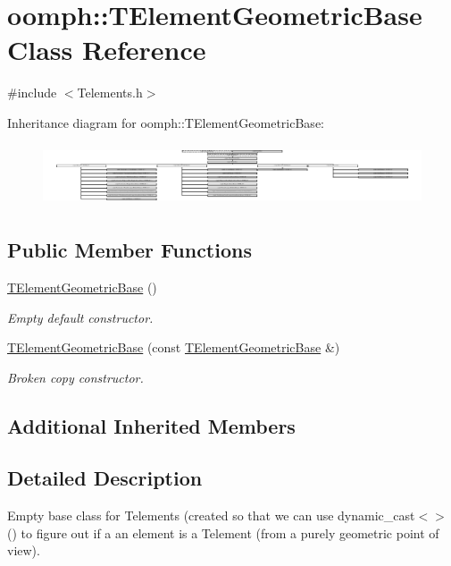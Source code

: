 \hypertarget{classoomph_1_1TElementGeometricBase}{}\section{oomph\+:\+:T\+Element\+Geometric\+Base Class Reference}
\label{classoomph_1_1TElementGeometricBase}


{\ttfamily \#include $<$Telements.\+h$>$}

Inheritance diagram for oomph\+:\+:T\+Element\+Geometric\+Base\+:\begin{figure}[H]
\begin{center}
\leavevmode
\includegraphics[height=1.842105cm]{classoomph_1_1TElementGeometricBase}
\end{center}
\end{figure}
\subsection*{Public Member Functions}
\begin{DoxyCompactItemize}
\item 
\hyperlink{classoomph_1_1TElementGeometricBase_a219a6604fc6c581f59a6d4ec63b142d3}{T\+Element\+Geometric\+Base} ()
\begin{DoxyCompactList}\small\item\em Empty default constructor. \end{DoxyCompactList}\item 
\hyperlink{classoomph_1_1TElementGeometricBase_aa6643f947e1f37fffaca02ed7ea48573}{T\+Element\+Geometric\+Base} (const \hyperlink{classoomph_1_1TElementGeometricBase}{T\+Element\+Geometric\+Base} \&)
\begin{DoxyCompactList}\small\item\em Broken copy constructor. \end{DoxyCompactList}\end{DoxyCompactItemize}
\subsection*{Additional Inherited Members}


\subsection{Detailed Description}
Empty base class for Telements (created so that we can use dynamic\+\_\+cast$<$$>$() to figure out if a an element is a Telement (from a purely geometric point of view). 


